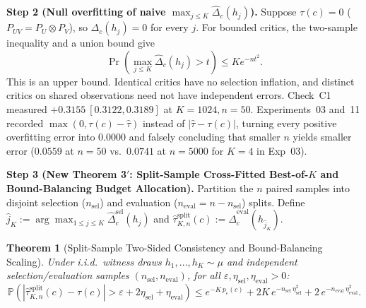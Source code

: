 \documentclass[11pt]{article}
\newtheorem{theorem}{Theorem}[section]
\newcommand{\Prob}{\mathbb{P}}
\begin{document}
\textbf{Step 2 (Null overfitting of naive $\max_{j \le K} \widehat{\Delta}_c(h_j)$).}
Suppose $\tau(c) = 0$ ($P_{UV} = P_U \otimes P_V$), so $\Delta_c(h_j) = 0$ for every $j$. For bounded critics, the two-sample inequality and a union bound give
\begin{equation}
\Pr\!\left(\max_{j\le K}\widehat\Delta_c(h_j)>t\right)\le K e^{-nt^2}.
\end{equation}
This is an upper bound. Identical critics have no selection inflation, and distinct critics on shared observations need not have independent errors. Check~C1 measured $+0.3155~[0.3122,0.3189]$ at $K=1024,n=50$. Experiments~03 and~11 recorded $\max(0, \tau(c) - \hat{\tau})$ instead of $|\hat{\tau} - \tau(c)|$, turning every positive overfitting error into $0.0000$ and falsely concluding that smaller $n$ yields smaller error ($0.0559$ at $n=50$ vs.\ $0.0741$ at $n=5000$ for $K=4$ in Exp~03).

\textbf{Step 3 (New Theorem 3$'$: Split-Sample Cross-Fitted Best-of-$K$ and Bound-Balancing Budget Allocation).}
Partition the $n$ paired samples into disjoint selection ($n_{\mathrm{sel}}$) and evaluation ($n_{\mathrm{eval}} = n - n_{\mathrm{sel}}$) splits. Define $\hat{j}_K := \arg\max_{1 \le j \le K} \widehat{\Delta}^{\mathrm{sel}}_c(h_j)$ and $\hat{\tau}^{\mathrm{split}}_{K,n}(c) := \widehat{\Delta}^{\mathrm{eval}}_c(h_{\hat{j}_K})$.

\begin{theorem}[Split-Sample Two-Sided Consistency and Bound-Balancing Scaling]
\label{thm:split_thm3p}
Under i.i.d.\ witness draws $h_1,\dots,h_K \sim \mu$ and independent selection/evaluation samples $(n_{\mathrm{sel}}, n_{\mathrm{eval}})$, for all $\varepsilon, \eta_{\mathrm{sel}}, \eta_{\mathrm{eval}} > 0$:
\begin{equation}
\boxed{\Prob\!\left(\left|\hat{\tau}^{\mathrm{split}}_{K,n}(c) - \tau(c)\right| > \varepsilon + 2\eta_{\mathrm{sel}} + \eta_{\mathrm{eval}}\right)
\le e^{-K\, p_\varepsilon(c)} + 2K\, e^{-n_{\mathrm{sel}}\,\eta_{\mathrm{sel}}^2} + 2\, e^{-n_{\mathrm{eval}}\,\eta_{\mathrm{eval}}^2}.}
\end{equation}
\end{theorem}
\end{document}
